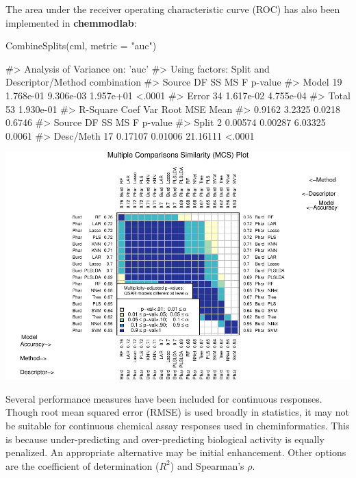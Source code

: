 The area under the receiver operating characteristic curve (ROC) has
also been implemented in \textbf{chemmodlab}:

\begin{Schunk}
\begin{Sinput}
CombineSplits(cml, metric = "auc")
\end{Sinput}
\begin{Soutput}
#>    Analysis of Variance on: 'auc'
#>  Using factors: Split and Descriptor/Method combination
#> Source    DF          SS          MS           F   p-value   
#> Model     19   1.768e-01   9.306e-03   1.957e+01    <.0001   
#> Error     34   1.617e-02   4.755e-04   
#> Total     53   1.930e-01   
#>       R-Square   Coef Var   Root MSE       Mean   
#>         0.9162     3.2325     0.0218     0.6746   
#> Source       DF         SS         MS          F   p-value   
#> Split         2    0.00574    0.00287    6.03325    0.0061   
#> Desc/Meth    17    0.17107    0.01006   21.16111    <.0001
\end{Soutput}

\includegraphics{chemmodlabRJournal_files/figure-latex/CombineSplits_auc-1} \end{Schunk}

Several performance measures have been included for continuous
responses. Though root mean squared error (RMSE) is used broadly in
statistics, it may not be suitable for continuous chemical assay
responses used in cheminformatics. This is because under-predicting and
over-predicting biological activity is equally penalized. An appropriate
alternative may be initial enhancement. Other options are the
coefficient of determination (\(R^2\)) and Spearman's \(\rho\).

